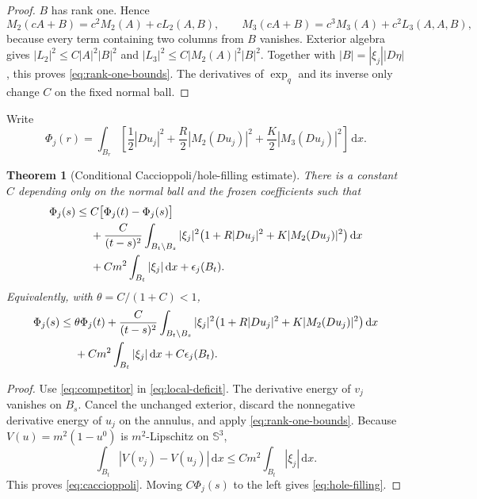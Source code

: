 \documentclass[10pt]{article}
\newtheorem{theorem}{Theorem}[section]
\newcommand{\dd}{\,\mathrm d}
\newcommand{\SSS}{\mathbb S}
\begin{document}
\begin{proof}
$B$ has rank one.  Hence
\[
 M_2(cA+B)=c^2M_2(A)+cL_2(A,B),\qquad
 M_3(cA+B)=c^3M_3(A)+c^2L_3(A,A,B),
\]
because every term containing two columns from $B$ vanishes.  Exterior
algebra gives
$|L_2|^2\leq C|A|^2|B|^2$ and
$|L_3|^2\leq C|M_2(A)|^2|B|^2$.  Together with
$|B|=|\xi_j||D\eta|$, this proves \eqref{eq:rank-one-bounds}.  The derivatives
of $\exp_q$ and its inverse only change $C$ on the fixed normal ball.
\end{proof}

Write
\begin{equation}
 \Phi_j(r)=\int_{B_r}\left[
 \frac12|Du_j|^2+\frac R2|M_2(Du_j)|^2
 +\frac K2|M_3(Du_j)|^2\right]\dd x.
 \label{eq:Phi}
\end{equation}

\begin{theorem}[Conditional Caccioppoli/hole-filling estimate]
There is a constant $C$ depending only on the normal ball and the frozen
coefficients such that
\begin{align}
 \Phi_j(s)
 \leq{}&C\bigl[\Phi_j(t)-\Phi_j(s)\bigr]\notag\\
 &+\frac{C}{(t-s)^2}\int_{B_t\setminus B_s}
 |\xi_j|^2\bigl(1+R|Du_j|^2+K|M_2(Du_j)|^2\bigr)\dd x\notag\\
 &+Cm^2\int_{B_t}|\xi_j|\dd x+\epsilon_j(B_t).
 \label{eq:caccioppoli}
\end{align}
Equivalently, with $\theta=C/(1+C)<1$,
\begin{align}
 \Phi_j(s)
 \leq{}&\theta\Phi_j(t)
 +\frac{C}{(t-s)^2}\int_{B_t\setminus B_s}
 |\xi_j|^2\bigl(1+R|Du_j|^2+K|M_2(Du_j)|^2\bigr)\dd x\notag\\
 &+Cm^2\int_{B_t}|\xi_j|\dd x+C\epsilon_j(B_t).
 \label{eq:hole-filling}
\end{align}
\end{theorem}

\begin{proof}
Use \eqref{eq:competitor} in \eqref{eq:local-deficit}.  The derivative energy
of $v_j$ vanishes on $B_s$.  Cancel the unchanged exterior, discard the
nonnegative derivative energy of $u_j$ on the annulus, and apply
\eqref{eq:rank-one-bounds}.  Because $V(u)=m^2(1-u^0)$ is $m^2$-Lipschitz on
$\SSS^3$,
\[
 \int_{B_t}|V(v_j)-V(u_j)|\dd x
 \leq Cm^2\int_{B_t}|\xi_j|\dd x.
\]
This proves \eqref{eq:caccioppoli}.  Moving
$C\Phi_j(s)$ to the left gives \eqref{eq:hole-filling}.
\end{proof}
\end{document}
